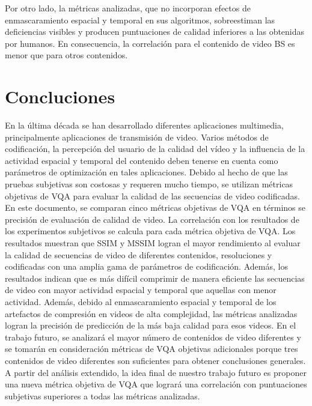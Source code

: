 \documentclass[conference]{IEEEtran}
\begin{document}
    Por otro lado, la métricas analizadas, que no incorporan efectos de 
    enmascaramiento espacial y temporal en sus algoritmos, sobreestiman 
    las deficiencias visibles y producen puntuaciones de calidad inferiores 
    a las obtenidas por humanos. En consecuencia, la correlación para el 
    contenido de video BS es menor que para otros contenidos. 

\section{Concluciones}
    En la última década se han desarrollado diferentes aplicaciones 
    multimedia, principalmente aplicaciones de transmisión de video.
    Varios métodos de codificación, la percepción del usuario de la 
    calidad del vídeo y la influencia de la actividad espacial y temporal del 
    contenido deben tenerse en cuenta como parámetros de optimización 
    en tales aplicaciones. Debido al hecho de que las pruebas subjetivas 
    son costosas y requeren mucho tiempo, se utilizan métricas 
    objetivas de VQA para evaluar la calidad de las secuencias de video 
    codificadas. En este documento, se comparan cinco métricas 
    objetivas de VQA en términos se precisión de evaluación de calidad 
    de video. La correlación con los resultados de los experimentos 
    subjetivos se calcula para cada métrica objetiva de VQA. Los 
    resultados muestran que SSIM y MSSIM logran el mayor rendimiento 
    al evaluar la calidad de secuencias de video de diferentes contenidos, 
    resoluciones y codificadas con una amplia gama de parámetros de 
    codificación. Además, los resultados indican que es más difícil 
    comprimir de manera eficiente las secuencias de video con mayor 
    actividad espacial y temporal que aquellas con menor actividad. 
    Además, debido al enmascaramiento espacial y temporal de los 
    artefactos de compresión en videos de alta complejidad, las métricas 
    analizadas logran la precisión de predicción de la más baja calidad 
    para esos videos. En el trabajo futuro, se analizará el mayor número 
    de contenidos de video diferentes y se tomarán en consideración 
    métricas de VQA objetivas adicionales porque tres contenidos de 
    video diferentes son suficientes para obtener conclusiones generales. 
    A partir del análisis extendido, la idea final de nuestro trabajo futuro 
    es proponer una nueva métrica objetiva de VQA que logrará una 
    correlación con puntuaciones subjetivas superiores a todas las 
    métricas analizadas.
\end{document}
